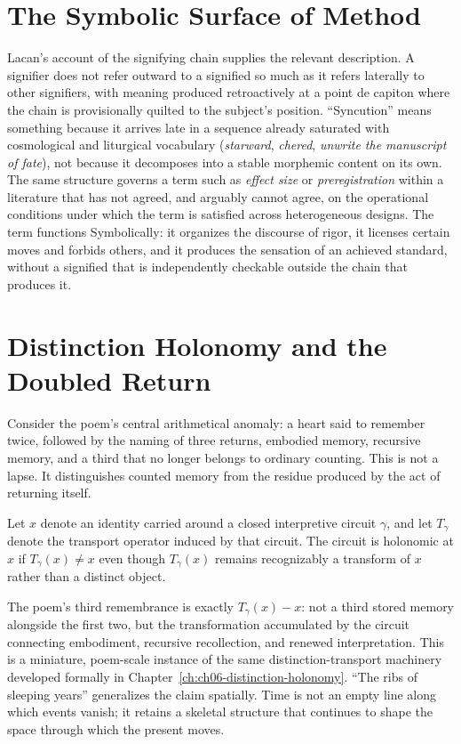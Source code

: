 \section{The Symbolic Surface of Method}

Lacan's account of the signifying chain supplies the relevant description. A signifier does not refer outward to a signified so much as it refers laterally to other signifiers, with meaning produced retroactively at a point de capiton where the chain is provisionally quilted to the subject's position. ``Syncution'' means something because it arrives late in a sequence already saturated with cosmological and liturgical vocabulary (\emph{starward}, \emph{chered}, \emph{unwrite the manuscript of fate}), not because it decomposes into a stable morphemic content on its own. The same structure governs a term such as \emph{effect size} or \emph{preregistration} within a literature that has not agreed, and arguably cannot agree, on the operational conditions under which the term is satisfied across heterogeneous designs. The term functions Symbolically: it organizes the discourse of rigor, it licenses certain moves and forbids others, and it produces the sensation of an achieved standard, without a signified that is independently checkable outside the chain that produces it.

\section{Distinction Holonomy and the Doubled Return}

Consider the poem's central arithmetical anomaly: a heart said to remember twice, followed by the naming of three returns, embodied memory, recursive memory, and a third that no longer belongs to ordinary counting. This is not a lapse. It distinguishes counted memory from the residue produced by the act of returning itself.

\begin{definition}
Let $x$ denote an identity carried around a closed interpretive circuit $\gamma$, and let $T_\gamma$ denote the transport operator induced by that circuit. The circuit is holonomic at $x$ if $T_\gamma(x) \neq x$ even though $T_\gamma(x)$ remains recognizably a transform of $x$ rather than a distinct object.
\end{definition}

The poem's third remembrance is exactly $T_\gamma(x) - x$: not a third stored memory alongside the first two, but the transformation accumulated by the circuit connecting embodiment, recursive recollection, and renewed interpretation. This is a miniature, poem-scale instance of the same distinction-transport machinery developed formally in Chapter~\ref{ch:ch06-distinction-holonomy}. ``The ribs of sleeping years'' generalizes the claim spatially. Time is not an empty line along which events vanish; it retains a skeletal structure that continues to shape the space through which the present moves.

